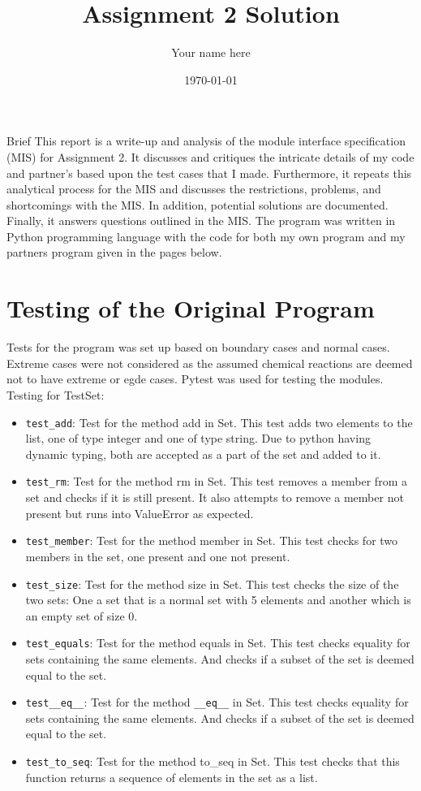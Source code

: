 \documentclass[12pt]{article}
\title{Assignment 2 Solution}
\author{Your name here}
\date{\today}
\begin{document}
\maketitle

Brief This report is a write-up and analysis of the module interface specification (MIS) for Assignment 2. It discusses and critiques the intricate details of my code and partner’s based upon the test cases that I made. Furthermore, it repeats this analytical process for the MIS and discusses the restrictions, problems, and shortcomings with the MIS. In addition, potential solutions are documented. Finally, it answers questions outlined in the MIS. The program was written in Python programming language with the code for both my own program and my partners program given in the pages below.


\section{Testing of the Original Program}
Tests for the program was set up based on boundary cases and normal cases. Extreme cases were not considered as the assumed chemical reactions are deemed not to have extreme or egde cases. Pytest was used for testing the modules.\\

Testing for TestSet:
\begin{itemize}
\item \texttt{test\_add}: Test for the method add in Set. This test adds two elements to the list, one of type integer and one of type string. Due to python having dynamic typing, both are accepted as a part of the set and added to it.
\item \texttt{test\_rm}: Test for the method rm in Set. This test removes a member from a set and checks if it is still present. It also attempts to remove a member not present but runs into ValueError as expected.
\item \texttt{test\_member}: Test for the method member in Set. This test checks for two members in the set, one present and one not present.
\item \texttt{test\_size}: Test for the method size in Set. This test checks the size of the two sets: One a set that is a normal set with 5 elements and another which is an empty set of size 0.
\item \texttt{test\_equals}: Test for the method equals in Set. This test checks equality for sets containing the same elements. And checks if a subset of the set is deemed equal to the set.
\item \texttt{test\_\_eq\_\_}: Test for the method \texttt{\_\_eq\_\_} in Set. This test checks equality for sets containing the same elements. And checks if a subset of the set is deemed equal to the set.
\item \texttt{test\_to\_seq}: Test for the method to\_seq in Set. This test checks that this function returns a sequence of elements in the set as a list. \\
\end{itemize}
\end{document}
